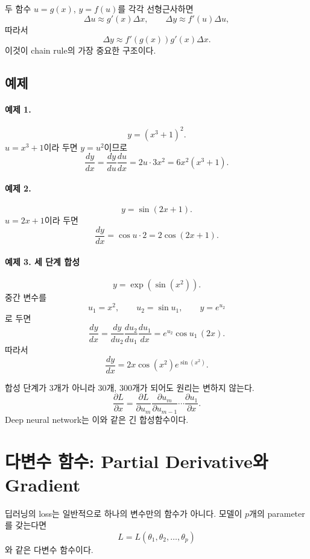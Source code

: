 \documentclass[11pt,a4paper]{article}
\begin{document}
두 함수 $u=g(x)$, $y=f(u)$를 각각 선형근사하면
\[
\Delta u\approx g'(x)\Delta x,
\qquad
\Delta y\approx f'(u)\Delta u,
\]
따라서
\[
\Delta y\approx f'(g(x))g'(x)\Delta x.
\]
이것이 chain rule의 가장 중요한 구조이다.

\subsection{예제}

\paragraph{예제 1.}
\[
y=(x^3+1)^2.
\]
$u=x^3+1$이라 두면 $y=u^2$이므로
\[
\frac{dy}{dx}
=
\frac{dy}{du}\frac{du}{dx}
=
2u\cdot 3x^2
=
6x^2(x^3+1).
\]

\paragraph{예제 2.}
\[
y=\sin(2x+1).
\]
$u=2x+1$이라 두면
\[
\frac{dy}{dx}
=
\cos u\cdot 2
=
2\cos(2x+1).
\]

\paragraph{예제 3. 세 단계 합성}
\[
y=\exp\!\left(\sin(x^2)\right).
\]
중간 변수를
\[
u_1=x^2,\qquad u_2=\sin u_1,\qquad y=e^{u_2}
\]
로 두면
\[
\frac{dy}{dx}
=
\frac{dy}{du_2}
\frac{du_2}{du_1}
\frac{du_1}{dx}
=
e^{u_2}\cos u_1\,(2x).
\]
따라서
\[
\boxed{
\frac{dy}{dx}
=2x\cos(x^2)e^{\sin(x^2)}
}.
\]

\begin{mlbox}
합성 단계가 3개가 아니라 30개, 300개가 되어도 원리는 변하지 않는다.
\[
\frac{\partial L}{\partial x}
=
\frac{\partial L}{\partial u_m}
\frac{\partial u_m}{\partial u_{m-1}}
\cdots
\frac{\partial u_1}{\partial x}.
\]
Deep neural network는 이와 같은 긴 합성함수이다.
\end{mlbox}

\section{다변수 함수: Partial Derivative와 Gradient}

딥러닝의 loss는 일반적으로 하나의 변수만의 함수가 아니다. 모델이 $p$개의 parameter를 갖는다면
\[
L=L(\theta_1,\theta_2,\ldots,\theta_p)
\]
와 같은 다변수 함수이다.
\end{document}
